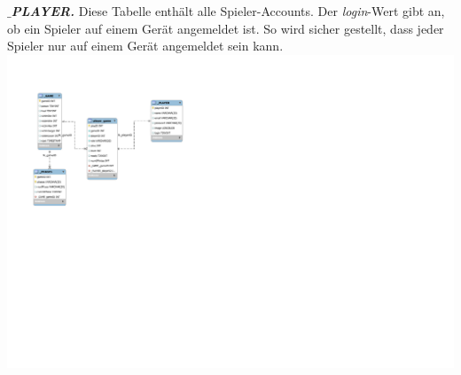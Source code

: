 \documentclass[12pt, a4paper]{article}
\begin{document}
\textbf{\textit{$\_$PLAYER.}}
Diese Tabelle enthält alle Spieler-Accounts. Der \textit{login}-Wert gibt an, ob ein Spieler auf einem Gerät angemeldet ist. So wird sicher gestellt, dass jeder Spieler nur auf einem Gerät angemeldet sein kann.
\\


\includegraphics[width = \textwidth]{DB_Schema}
\end{document}

